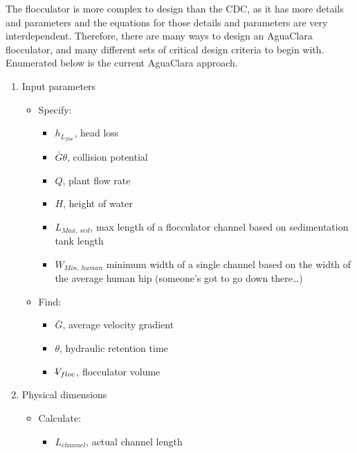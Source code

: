 \documentclass[letterpaper,10pt,english]{sphinxmanual}
\begin{document}
The flocculator is more complex to design than the CDC, as it has more details and parameters and the equations for those details and parameters are very interdependent. Therefore, there are many ways to design an AguaClara flocculator, and many different sets of critical design criteria to begin with. Enumerated below is the current AguaClara approach.
\begin{enumerate}
\item {} 
Input parameters
\begin{itemize}
\item {} 
Specify:
\begin{itemize}
\item {} 
\(h_{L_{floc}}\), head loss

\item {} 
\(\bar G \theta\), collision potential

\item {} 
\(Q\), plant flow rate

\item {} 
\(H\), height of water 

\item {} 
\(L_{Max, \, sed}\), max length of a flocculator channel based on sedimentation tank length

\item {} 
\(W_{Min, \, human}\) minimum width of a single channel based on the width of the average human hip (someone’s got to
go down there…)

\end{itemize}

\item {} 
Find:
\begin{itemize}
\item {} 
\(\bar G\), average velocity gradient

\item {} 
\(\theta\), hydraulic retention time

\item {} 
\(\rlap{-}V_{floc}\), flocculator volume

\end{itemize}

\end{itemize}

\item {} 
Physical dimensions
\begin{itemize}
\item {} 
Calculate:
\begin{itemize}
\item {} 
\(L_{channel}\), actual channel length


\end{itemize}
\end{itemize}
\end{enumerate}
\end{document}

